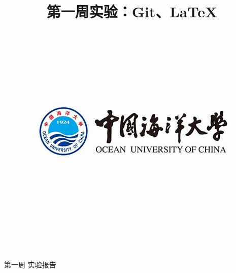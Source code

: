 \documentclass[UTF8]{ctexart}
\title{{\heiti  第一周实验：Git、LaTeX }\vspace{-2em}}
\date{}
\begin{document}
\thispagestyle{empty}  %
\begin{figure}[tph!] %
	\centering
	\includegraphics[width=0.7\linewidth]{figure/2}
	
\end{figure}

\begin{center}%
	\quad \\ %
	\quad \\
	\quad \\
	\quad \\
	\heiti \fontsize{30}{17} \quad \quad 第\quad 一\quad 周\quad \quad \quad 
	\vskip 0.5cm
	\songti {} 实\quad 验\quad 报\quad 告%
\end{center}
\vskip 1cm
\end{document}
